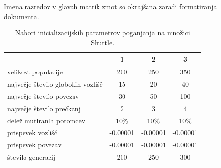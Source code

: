 Imena razredov v glavah matrik zmot so okrajšana zaradi formatiranja dokumenta.
\begin{table}[H]
    \begin{center}
        \begin{tabular}{||l c c c||}
            \hline
            & 1        & 2        & 3 \\ [0.5ex]
            \hline
            velikost populacije               & 200      & 250      & 350      \\
            \hline
            največje število globokih vozlišč & 15       & 20       & 40       \\
            \hline
            največje število povezav          & 30       & 50       & 100      \\
            \hline
            največje število prečkanj         & 2        & 3        & 4        \\
            \hline
            delež mutiranih potomcev          & 10\%     & 10\%     & 10\%     \\
            \hline
            prispevek vozlišč                 & -0.00001 & -0.00001 & -0.00001 \\
            \hline
            prispevek povezav                 & -0.00001 & -0.00001 & -0.00001 \\
            \hline
            število generacij                 & 200      & 250      & 300      \\
            \hline
        \end{tabular}
    \end{center}
    \caption{Nabori inicializacijskih parametrov poganjanja na množici Shuttle.}
    \label{tab:param_statlog}
\end{table}

